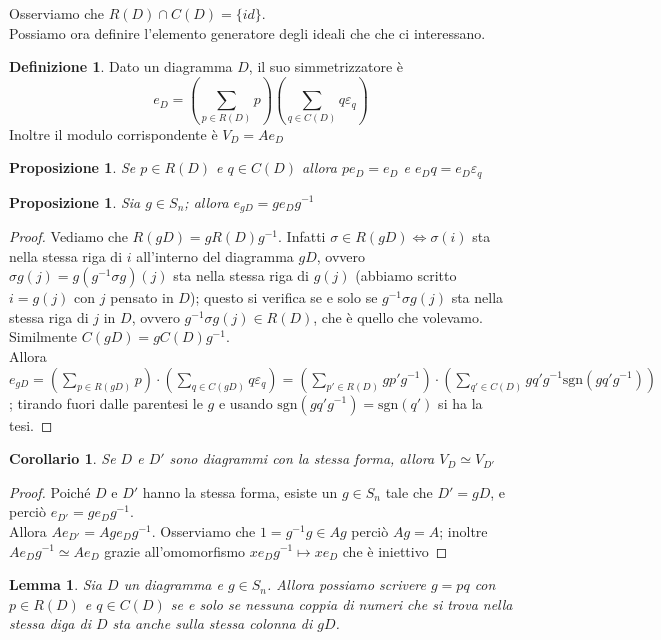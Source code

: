 \documentclass[11pt]{article}
\theoremstyle{plain}
\newtheorem{lemma}[thm]{Lemma}
\newtheorem{prop}[thm]{Proposizione}
\newtheorem*{cor}{Corollario}
\theoremstyle{definition}
\newtheorem{defn}{Definizione}[section]
\theoremstyle{remark}
\DeclareMathOperator{\iso}{\simeq}
\begin{document}
Osserviamo che $R(D)\cap C(D)=\{id\}$.\\
Possiamo ora definire l'elemento generatore degli ideali che che ci interessano.
\begin{defn}
	Dato un diagramma $D$, il suo simmetrizzatore è $$e_D=\left(\sum_{p\in R(D)}p \right)\left(\sum_{q\in C(D)}q\varepsilon_q\right)$$
	Inoltre il modulo corrispondente è $V_D=Ae_D$
\end{defn}
\begin{prop}\label{prop:assorbimento eD}
	Se $p\in R(D)$ e $q\in C(D)$ allora $pe_D=e_D$ e $e_Dq=e_D\varepsilon_q$
\end{prop}
\begin{prop}
	Sia $g\in S_n$; allora $e_{gD}=ge_Dg^{-1}$
\end{prop}
\begin{proof}
	Vediamo che $R(gD)=gR(D)g^{-1}$. Infatti $\sigma\in R(gD)\iff\sigma(i)$ sta nella stessa riga di $i$ all'interno del diagramma $gD$, ovvero $\sigma g (j)=g(g^{-1}\sigma g)(j)$ sta nella stessa riga di $g(j)$ (abbiamo scritto $i=g(j)$ con $j$ pensato in $D$); questo si verifica se e solo se $g^{-1}\sigma g(j)$ sta nella stessa riga di $j$ in $D$, ovvero $g^{-1}\sigma g(j)\in R(D)$, che è quello che volevamo.\\
	Similmente $C(gD)=gC(D)g^{-1}$.\\
	Allora $\displaystyle e_{gD}=\left(\sum_{p\in R(gD)}p \right)\cdot\left(\sum_{q\in C(gD)}q\varepsilon_q\right)=\left(\sum_{p'\in R(D)}gp'g^{-1} \right)\cdot\left(\sum_{q'\in C(D)}gq'g^{-1}\text{sgn}(gq'g^{-1})\right)$; tirando fuori dalle parentesi le $g$ e usando $\text{sgn}(gq'g^{-1})=\text{sgn}(q')$ si ha la tesi.
\end{proof}
\begin{cor}
	Se $D$ e $D'$ sono diagrammi con la stessa forma, allora $V_D\iso V_{D'}$
\end{cor}
\begin{proof}
	Poiché $D$ e $D'$ hanno la stessa forma, esiste un $g\in S_n$ tale che $D'=gD$, e perciò $e_{D'}=ge_Dg^{-1}$.\\
	Allora $Ae_{D'}=Age_Dg^{-1}$. Osserviamo che $1=g^{-1}g\in Ag$ perciò $Ag=A$; inoltre $Ae_Dg^{-1}\iso Ae_D$ grazie all'omomorfismo $xe_Dg^{-1}\mapsto xe_D$ che è iniettivo
\end{proof}
\begin{lemma}\label{Sn:g=pq}
	Sia $D$ un diagramma e $g\in S_n$. Allora possiamo scrivere $g=pq$ con $p\in R(D)$ e $q\in C(D)$ se e solo se nessuna coppia di numeri che si trova nella stessa diga di $D$ sta anche sulla stessa colonna di $gD$.
\end{lemma}
\end{document}
